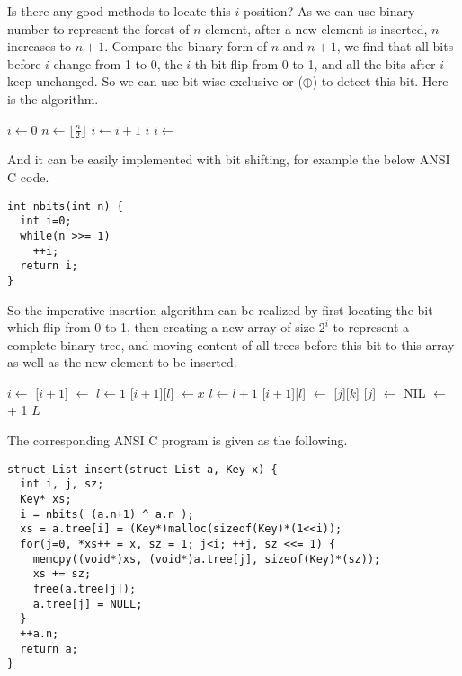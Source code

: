 \documentclass[UTF8]{article}
\begin{document}
Is there any good methods to locate this $i$ position? As we can use binary number
to represent the forest of $n$ element, after a new element is inserted, $n$
increases to $n+1$. Compare the binary form of $n$ and $n+1$, we find that
all bits before $i$ change from 1 to 0, the $i$-th bit flip from 0 to 1, and
all the bits after $i$ keep unchanged. So we can use bit-wise exclusive or ($\oplus$) to detect
this bit. Here is the algorithm.

\begin{algorithmic}
  \State $i \gets 0$
    \State $ n \gets \lfloor \frac{n}{2} \rfloor$
    \State $ i \gets i + 1$
  \EndWhile
  \State \Return $i$
\EndFunction
\Statex
\State $i \gets $ 
\end{algorithmic}

And it can be easily implemented with bit shifting, for example the below ANSI C
code.

\begin{lstlisting}
int nbits(int n) {
  int i=0;
  while(n >>= 1)
    ++i;
  return i;
}
\end{lstlisting}

So the imperative insertion algorithm can be realized by first locating the bit which
flip from 0 to 1, then creating a new array of size $2^i$ to represent a complete
binary tree, and moving content of all trees before this bit to this array as well
as the new element to be inserted.

\begin{algorithmic}
  \State $i \gets $ 
  \State {}[$i+1$] $\gets $ 
  \State $l \gets 1$
  \State  {}[$i+1$][$l$]  $\gets x$
      \State $l \gets l + 1$
      \State {}[$i+1$][$l$]  $\gets$ [$j$][$k$]
    \EndFor
    \State {}[$j$] $\gets$ NIL
  \EndFor
  \State {} $\gets$  + 1
  \State \Return $L$
\EndFunction
\end{algorithmic}

The corresponding ANSI C program is given as the following.

\begin{lstlisting}
struct List insert(struct List a, Key x) {
  int i, j, sz;
  Key* xs;
  i = nbits( (a.n+1) ^ a.n );
  xs = a.tree[i] = (Key*)malloc(sizeof(Key)*(1<<i));
  for(j=0, *xs++ = x, sz = 1; j<i; ++j, sz <<= 1) {
    memcpy((void*)xs, (void*)a.tree[j], sizeof(Key)*(sz));
    xs += sz;
    free(a.tree[j]);
    a.tree[j] = NULL;
  }
  ++a.n;
  return a;
}
\end{lstlisting}
\end{document}
